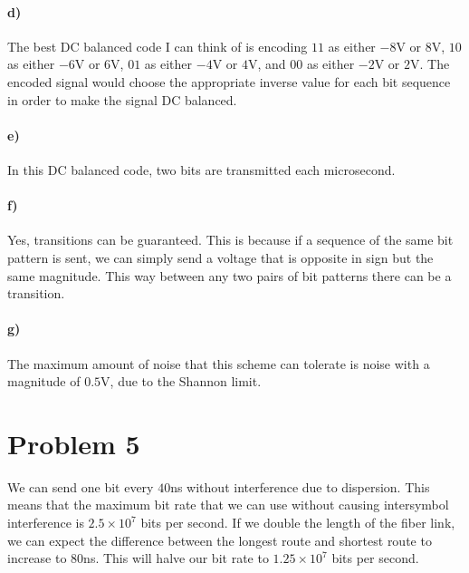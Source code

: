 \documentclass[12pt]{article}
\begin{document}
\paragraph{d)}

The best DC balanced code I can think of is encoding \(11\) as either \(-8\)V or \(8\)V, \(10\) as either \(-6\)V or \(6\)V, \(01\) as either \(-4\)V or \(4\)V, and \(00\) as either \(-2\)V or \(2\)V.
The encoded signal would choose the appropriate inverse value for each bit sequence in order to make the signal DC balanced.

\paragraph{e)}

In this DC balanced code, two bits are transmitted each microsecond.

\paragraph{f)}

Yes, transitions can be guaranteed. This is because if a sequence of the same bit pattern is sent, we can simply send a voltage that is opposite in sign but the same magnitude. This way between any two
pairs of bit patterns there can be a transition.

\paragraph{g)}

The maximum amount of noise that this scheme can tolerate is noise with a magnitude of \(0.5\)V, due to the Shannon limit.

\section*{Problem 5}

We can send one bit every \(40\)ns without interference due to dispersion. This means that the maximum bit rate that we can use without causing intersymbol
interference is \(2.5\times 10^7\) bits per second. If we double the length of the fiber link, we can expect the difference between the longest route and shortest
route to increase to \(80\)ns. This will halve our bit rate to \(1.25\times 10^7\) bits per second.
\end{document}
